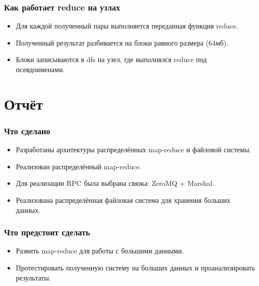 \documentclass{beamer}
\begin{document}
    \begin{frame}
    \frametitle{Как работает reduce на узлах}
        \begin{itemize}
            \item Для каждой полученный пары выполняется переданная функция reduce.
            \item Полученный результат разбивается на блоки равного размера (64мб).
            \item Блоки записываются в dfs на узел, где выполнялся reduce под псевдоименами.
        \end{itemize}        
    \end{frame}


\section{Отчёт}
    \begin{frame}
    \frametitle{Что сделано}
        \begin{itemize}
            \item Разработаны архитектуры распределённых map-reduce и файловой системы.
            \item Реализован распределённый map-reduce.
            \item Для реализации RPC была выбрана связка: ZeroMQ + Marshal.
            \item Реализована распределённая файловая система для хранения больших данных.
        \end{itemize} 
    \end{frame}

    \begin{frame}
    \frametitle{Что предстоит сделать}
        \begin{itemize}
            \item Развить map-reduce для работы с большими данными.
            \item Протестировать полученную систему на больших данных и проанализировать результаты.
        \end{itemize} 
    \end{frame}

\begin{frame}
    \titlepage
\end{frame}
\end{document}
